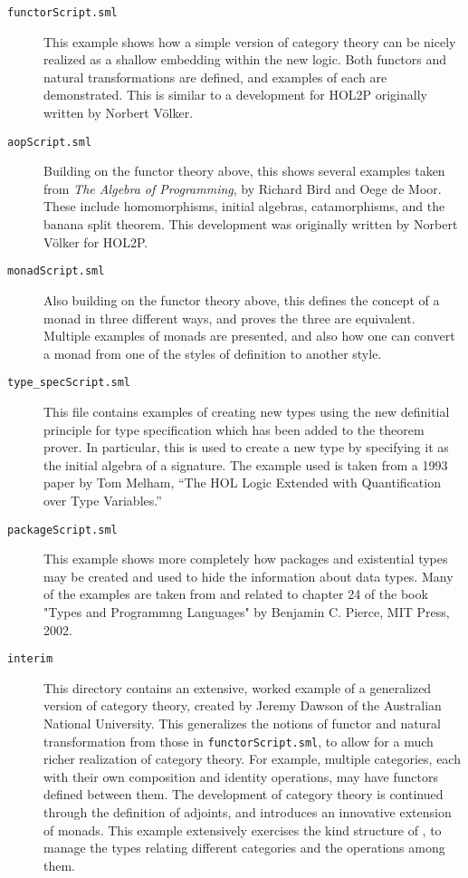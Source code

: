 \begin{description}

\item [\tt functorScript.sml]

  This example shows how a simple version of category theory can
  be nicely realized as a shallow embedding within the new logic.
  Both functors and natural transformations are defined, and
  examples of each are demonstrated. This is similar to a development
  for HOL2P originally written by Norbert V\"{o}lker.

\item [\tt aopScript.sml]

  Building on the functor theory above, this shows several examples
  taken from {\it The Algebra of Programming}, by Richard Bird and Oege de Moor.
  These include homomorphisms, initial algebras, catamorphisms, and
  the banana split theorem.  This development was originally written
  by Norbert V\"{o}lker for HOL2P.

\item [\tt monadScript.sml]

  Also building on the functor theory above, this defines the concept
  of a monad in three different ways, and proves the three are equivalent.
  Multiple examples of monads are presented, and also how one can convert
  a monad from one of the styles of definition to another style.

\item [\tt type\_specScript.sml]

  This file contains examples of creating new types using the new definitial
  principle for type specification which has been added to the \HOLW{} theorem
  prover. In particular, this is used to create a new type by specifying it as
  the initial algebra of a signature. The example used is taken from a 1993
  paper by Tom Melham, ``The HOL Logic Extended with Quantification over Type
  Variables.''

\item [\tt packageScript.sml]

  This example shows more completely how packages and existential types
  may be created and used to hide the information about data types.
  Many of the examples are taken from and related to chapter 24 of the book
  "Types and Programmng Languages" by Benjamin C. Pierce, MIT Press, 2002.

\item[\tt interim]

This directory contains an extensive, worked example of a generalized
version of category theory, created by Jeremy Dawson of the Australian National
University. This generalizes the notions of functor and natural transformation
from those in \texttt{functorScript.sml}, to allow for a much richer realization
of category theory. For example, multiple categories, each with their own composition
and identity operations, may have functors defined between them.
The development of category theory is continued through the definition of adjoints,
and introduces an innovative extension of monads.
This example extensively exercises the kind structure of \HOLW, to manage
the types relating different categories and the operations among them.


\end{description}
